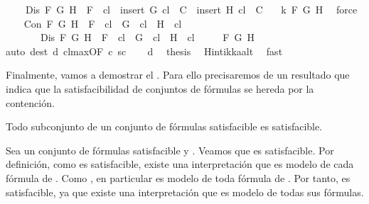 \begin{isabellebody}
\ \ \ \ {\isachardoublequoteopen}Dis\ F\ G\ H\ {\isasymLongrightarrow}\ F\ {\isasymin}\ {\isacharquery}cl\ {\isasymLongrightarrow}\ insert\ G\ {\isacharquery}cl\ {\isasymin}\ C\ {\isasymor}\ insert\ H\ {\isacharquery}cl\ {\isasymin}\ C{\isachardoublequoteclose}\isanewline
\ \ \ k\ F\ G\ H\ \isamarkupfalse%
\ force{\isacharplus}\isanewline
\ \ \isamarkupfalse%
\ {\isachardoublequoteopen}Con\ F\ G\ H\ {\isasymLongrightarrow}\ F\ {\isasymin}\ {\isacharquery}cl\ {\isasymLongrightarrow}\ G\ {\isasymin}\ {\isacharquery}cl\ {\isasymand}\ H\ {\isasymin}\ {\isacharquery}cl{\isachardoublequoteclose}\isanewline
\ \ \ \ \ \ \ {\isachardoublequoteopen}Dis\ F\ G\ H\ {\isasymLongrightarrow}\ F\ {\isasymin}\ {\isacharquery}cl\ {\isasymLongrightarrow}\ G\ {\isasymin}\ {\isacharquery}cl\ {\isasymor}\ H\ {\isasymin}\ {\isacharquery}cl{\isachardoublequoteclose}\isanewline
\ \ \ \ \ F\ G\ H\isanewline
\ \ \ \ \ \ \ \isamarkupfalse%
{\isacharparenleft}auto\ dest{\isacharcolon}\ d{\isacharparenleft}{}{\isacharminus}{\isacharparenright}\ cl{\isacharunderscore}max{\isacharprime}{\isacharbrackleft}OF\ c\ sc{\isacharbrackright}{\isacharparenright}\isanewline
\ \ \isamarkupfalse%
\ d{\isacharparenleft}{}{\isacharcomma}{}{\isacharparenright}\ \isamarkupfalse%
\ {\isacharquery}thesis\ \isamarkupfalse%
\ Hintikka{\isacharunderscore}alt\ \isamarkupfalse%
\ fast\isanewline
{}\isamarkupfalse%
%
\endisatagproof
{\isafoldproof}%
%
\isadelimproof
%
\endisadelimproof
%
\begin{isamarkuptext}%
Finalmente, vamos a demostrar el . Para ello precisaremos de
  un resultado que indica que la satisfacibilidad de conjuntos de fórmulas se hereda por la 
  contención.

  \begin{lema}
    Todo subconjunto de un conjunto de fórmulas satisfacible es satisfacible.
  \end{lema}

  \begin{demostracion}
    Sea  un conjunto de fórmulas satisfacible y . Veamos que  es satisfacible.
    Por definición, como  es satisfacible, existe una interpretación \isa{{\isasymA}} que es modelo de cada 
    fórmula de . Como , en particular \isa{{\isasymA}} es modelo de toda fórmula de . Por tanto, 
     es satisfacible, ya que existe una interpretación que es modelo de todas sus fórmulas.
  \end{demostracion}


\end{isamarkuptext}
\end{isabellebody}
